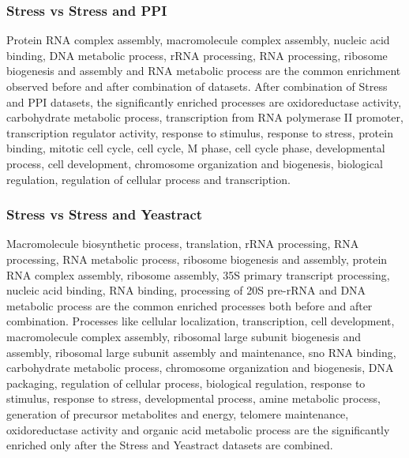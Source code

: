 \subsubsection{Stress vs Stress and PPI}
Protein RNA complex assembly, macromolecule complex assembly, nucleic acid binding, DNA metabolic process, rRNA processing, RNA processing, 
ribosome biogenesis and assembly and RNA metabolic process are the common enrichment observed before and after combination of datasets. 
After combination of Stress and PPI datasets, the significantly enriched processes are oxidoreductase activity, carbohydrate metabolic process, 
transcription from RNA polymerase II promoter, transcription regulator activity, response to stimulus, response to stress, protein binding, mitotic cell 
cycle, cell cycle, M phase, cell cycle phase, developmental process, cell development, chromosome organization and biogenesis, biological regulation, 
regulation of cellular process and transcription.

\subsubsection{Stress vs Stress and Yeastract}
Macromolecule biosynthetic process, translation, rRNA processing, RNA processing, RNA metabolic process, ribosome biogenesis and assembly, 
protein RNA complex assembly, ribosome  assembly, 35S primary transcript processing, nucleic acid binding, RNA binding, processing of 20S pre-rRNA and 
DNA metabolic process are the common enriched processes both before and after combination. Processes like cellular localization, transcription, 
cell development, macromolecule complex 
assembly, ribosomal large subunit biogenesis and assembly, ribosomal large subunit assembly and maintenance, sno RNA binding, carbohydrate 
metabolic process, chromosome organization and biogenesis, DNA packaging, regulation of cellular process, biological regulation, response to stimulus, 
response to stress, developmental process, amine metabolic process, generation of precursor metabolites and energy, telomere maintenance, 
oxidoreductase activity and organic acid metabolic process  are the significantly enriched only after the Stress and Yeastract datasets are combined.

